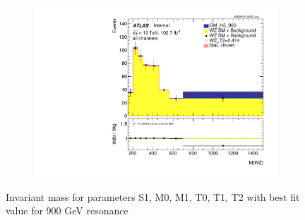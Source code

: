 \documentclass[../Bachelorarbeit.tex]{subfiles}
\begin{document}
\begin{figure}[h]
\begin{subfigure}{0.35\textwidth}
    \end{subfigure}
    \begin{subfigure}{0.35\textwidth}
        \includegraphics[width=\textwidth]{Plots/ALL_MWZ_right_color/GM_H5_900/T2/2022-05-07/VBSSR/all_VV_MWZ_vbs.pdf}
    \end{subfigure}

    \caption{Invariant mass for parameters S1, M0, M1, T0, T1, T2 with best fit value for 900 GeV resonance}
    \label{fig:all_mwz_900}
\end{figure}
\end{document}
